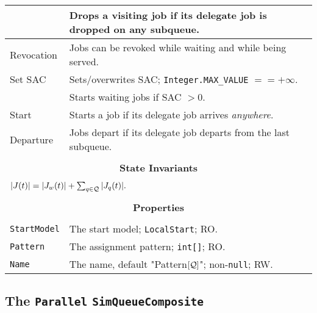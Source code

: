 \begin{tabular}{|l|l|}
	& Drops a visiting job if its delegate job is dropped on any subqueue. \\
	\hline
	Revocation & Jobs can be revoked while waiting and while being served. \\
	\hline
	Set SAC & Sets/overwrites SAC; \lstinline|Integer.MAX_VALUE| $== +\infty$. \\
	& Starts waiting jobs if SAC $> 0$. \\
	\hline
	Start & Starts a job if its delegate job arrives {\em anywhere}. \\
	\hline
	Departure & Jobs depart if its delegate job departs from the last subqueue. \\
	\hline
	\multicolumn{2}{|c|}{} \\
	\multicolumn{2}{|c|}{\bf State  Invariants} \\
	\multicolumn{2}{|c|}{} \\
	\hline
	\multicolumn{2}{|l|}{$|J(t)| = |J_{w}(t)| + \sum_{q \in \cal{Q}} |J_{q}(t)|.$} \\
	\hline
	\multicolumn{2}{|c|}{} \\
	\multicolumn{2}{|c|}{\bf Properties} \\
	\multicolumn{2}{|c|}{} \\
	\hline
	\lstinline|StartModel| & The start model; \lstinline|LocalStart|; RO. \\
	\hline
	\lstinline|Pattern|    & The assignment pattern; \lstinline|int[]|; RO. \\
	\hline
	\lstinline|Name|       & The name, default "Pattern$[\cal{Q}]$"; non-\lstinline|null|; RW. \\
	\hline
\end{tabular}

\subsection{The \lstinline{Parallel} \lstinline{SimQueueComposite}}
\label{sec:Parallel}

